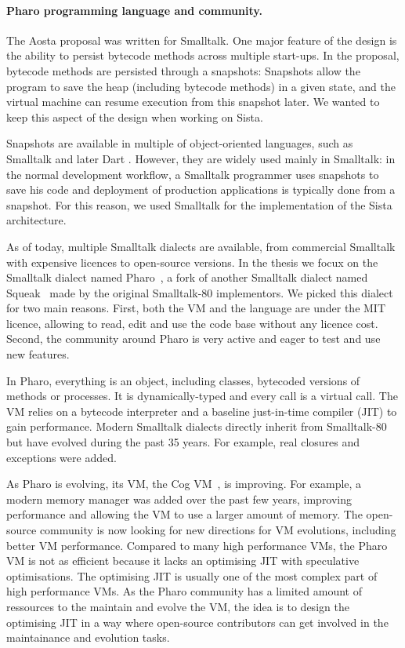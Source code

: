 \documentclass[a4paper,12pt,twoside]{../includes/ThesisStyle}
\begin{document}
\paragraph{Pharo programming language and community.}

The Aosta proposal was written for Smalltalk. One major feature of the design is the ability to persist bytecode methods across multiple start-ups. In the proposal, bytecode methods are persisted through a snapshots: Snapshots allow the program to save the heap (including bytecode methods) in a given state, and the virtual machine can resume execution from this snapshot later. We wanted to keep this aspect of the design when working on Sista.

Snapshots are available in multiple of object-oriented languages, such as Smalltalk and later Dart \cite{Anna13a}. However, they are widely used mainly in Smalltalk: in the normal development workflow, a Smalltalk programmer uses snapshots to save his code and deployment of production applications is typically done from a snapshot. For this reason, we used Smalltalk for the implementation of the Sista architecture.

As of today, multiple Smalltalk dialects are available, from commercial Smalltalk with expensive licences to open-source versions. In the thesis we focux on the Smalltalk dialect named Pharo~\cite{Blac09a}, a fork of another Smalltalk dialect named Squeak~\cite{Blac07a} made by the original Smalltalk-80 implementors. We picked this dialect for two main reasons. First, both the VM and the language are under the MIT licence, allowing to read, edit and use the code base without any licence cost. Second, the community around Pharo is very active and eager to test and use new features.

In Pharo, everything is an object, including classes, bytecoded versions of methods or processes. It is dynamically-typed and every call is a virtual call. The VM relies on a bytecode interpreter and a baseline just-in-time compiler (JIT) to gain performance. Modern Smalltalk dialects directly inherit from Smalltalk-80~\cite{Gold83a} but have evolved during the past 35 years. For example, real closures and exceptions were added.

As Pharo is evolving, its VM, the Cog VM~\cite{Mira08a}, is improving. For example, a modern memory manager was added over the past few years, improving performance and allowing the VM to use a larger amount of memory. The open-source community is now looking for new directions for VM evolutions, including better VM performance. Compared to many high performance VMs, the Pharo VM is not as efficient because it lacks an optimising JIT with speculative optimisations. The optimising JIT is usually one of the most complex part of high performance VMs. As the Pharo community has a limited amount of ressources to the maintain and evolve the VM, the idea is to design the optimising JIT in a way where open-source contributors can get involved in the maintainance and evolution tasks.
\end{document}
